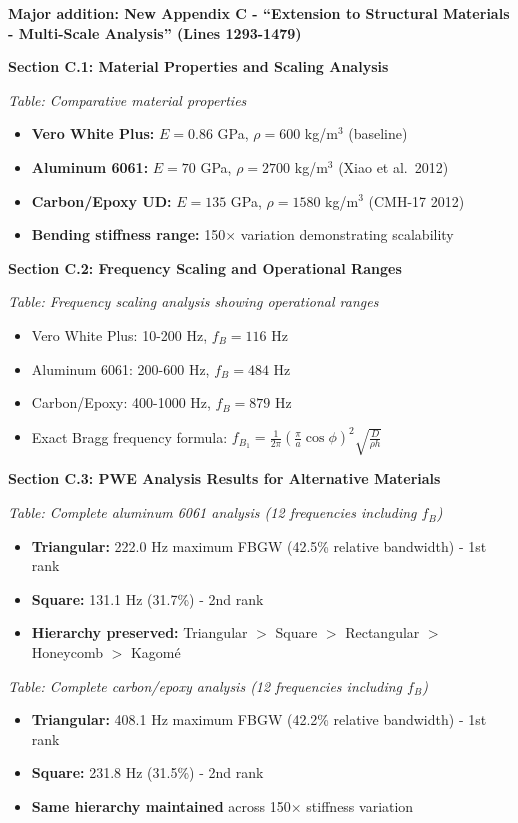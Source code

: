 \documentclass[11pt,a4paper]{article}
\newenvironment{changesbox}{%
    \par\medskip\noindent{\color{changescolor}\rule{\linewidth}{2pt}}\par
    \noindent{\color{changescolor}\bfseries Manuscript Changes}\par\smallskip
}{%
    \par\noindent{\color{changescolor}\rule{\linewidth}{0.5pt}}\medskip
}
\begin{document}
\begin{changesbox}
\textbf{Major addition: New Appendix C - ``Extension to Structural Materials - Multi-Scale Analysis'' (Lines 1293-1479)}

\textbf{Section C.1: Material Properties and Scaling Analysis}

\textit{Table: Comparative material properties}
\begin{itemize}
    \item \textbf{Vero White Plus:} $E = 0.86$ GPa, $\rho = 600$ kg/m$^3$ (baseline)
    \item \textbf{Aluminum 6061:} $E = 70$ GPa, $\rho = 2700$ kg/m$^3$ (Xiao et al.~2012)
    \item \textbf{Carbon/Epoxy UD:} $E = 135$ GPa, $\rho = 1580$ kg/m$^3$ (CMH-17 2012)
    \item \textbf{Bending stiffness range:} 150$\times$ variation demonstrating scalability
\end{itemize}

\textbf{Section C.2: Frequency Scaling and Operational Ranges}

\textit{Table: Frequency scaling analysis showing operational ranges}
\begin{itemize}
    \item Vero White Plus: 10-200 Hz, $f_B = 116$ Hz
    \item Aluminum 6061: 200-600 Hz, $f_B = 484$ Hz
    \item Carbon/Epoxy: 400-1000 Hz, $f_B = 879$ Hz
    \item Exact Bragg frequency formula: $f_{B_1} = \frac{1}{2\pi}\left(\frac{\pi}{a}\cos\phi\right)^2 \sqrt{\frac{D}{\rho h}}$
\end{itemize}

\textbf{Section C.3: PWE Analysis Results for Alternative Materials}

\textit{Table: Complete aluminum 6061 analysis (12 frequencies including $f_B$)}
\begin{itemize}
    \item \textbf{Triangular:} 222.0 Hz maximum FBGW (42.5\% relative bandwidth) - 1st rank
    \item \textbf{Square:} 131.1 Hz (31.7\%) - 2nd rank
    \item \textbf{Hierarchy preserved:} Triangular $>$ Square $>$ Rectangular $>$ Honeycomb $>$ Kagomé
\end{itemize}

\textit{Table: Complete carbon/epoxy analysis (12 frequencies including $f_B$)}
\begin{itemize}
    \item \textbf{Triangular:} 408.1 Hz maximum FBGW (42.2\% relative bandwidth) - 1st rank
    \item \textbf{Square:} 231.8 Hz (31.5\%) - 2nd rank
    \item \textbf{Same hierarchy maintained} across 150$\times$ stiffness variation
\end{itemize}


\end{changesbox}
\end{document}

